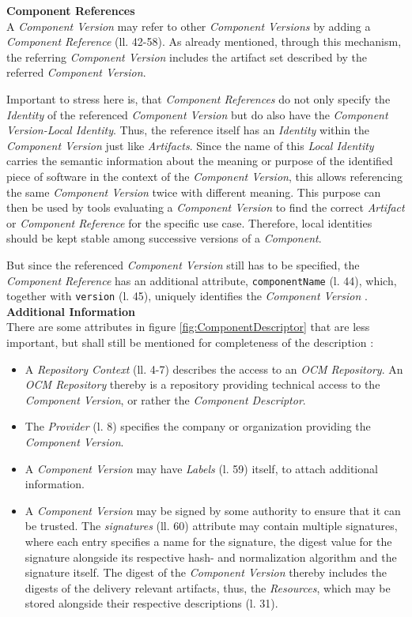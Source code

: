 \noindent\textbf{Component References}\\
A \emph{Component Version} may refer to other \emph{Component Versions} by adding a \emph{Component Reference} (ll. 42-58). As already mentioned, through this mechanism, the referring \emph{Component Version} includes the artifact set described by the referred \emph{Component Version}.\par
Important to stress here is, that \emph{Component References} do not only specify the \emph{Identity} of the referenced \emph{Component Version} but do also have the \emph{Component Version-Local Identity}. Thus, the reference itself has an \emph{Identity} within the \emph{Component Version} just like \emph{Artifacts}. Since the name of this \emph{Local Identity} carries the semantic information about the meaning or purpose of the identified piece of software in the context of the \emph{Component Version}, this allows referencing the same \emph{Component Version} twice with different meaning. This purpose can then be used by tools evaluating a \emph{Component Version} to find the correct \emph{Artifact} or \emph{Component Reference} for the specific use case. Therefore, local identities should be kept stable among successive versions of a \emph{Component}.\par
But since the referenced \emph{Component Version} still has to be specified, the \emph{Component Reference} has an additional attribute, \lstinline|componentName| (l. 44), which, together with \lstinline|version| (l. 45), uniquely identifies the \emph{Component Version} \cite{OCMSpec}.\\

\noindent\textbf{Additional Information}\\
There are some attributes in figure \ref{fig:ComponentDescriptor} that are less important, but shall still be mentioned for completeness of the description \cite{OCMSpec}:
\begin{itemize}
\item A \emph{Repository Context} (ll. 4-7) describes the access to an \emph{OCM Repository}. An \emph{OCM Repository} thereby is a repository providing technical access to the \emph{Component Version}, or rather the \emph{Component Descriptor}. 
\item The \emph{Provider} (l. 8) specifies the company or organization providing the \emph{Component Version}.
\item A \emph{Component Version} may have \emph{Labels} (l. 59) itself, to attach additional information. 
\item A \emph{Component Version} may be signed by some authority to ensure that it can be trusted. The \emph{signatures} (ll. 60) attribute may contain multiple signatures, where each entry specifies a name for the signature, the digest value for the signature alongside its respective hash- and normalization algorithm and the signature itself. The digest of the \emph{Component Version} thereby includes the digests of the delivery relevant artifacts, thus, the \emph{Resources}, which may be stored alongside their respective descriptions (l. 31).
\end{itemize}

